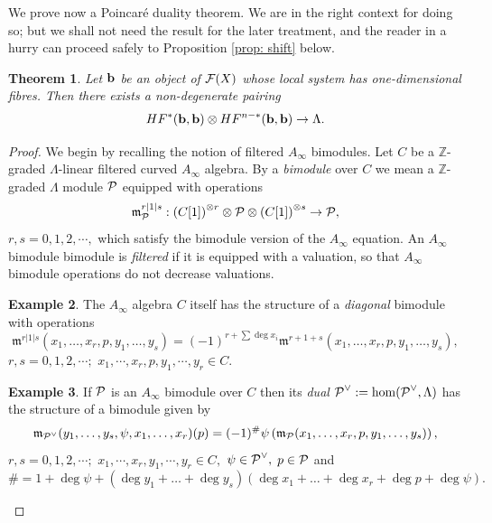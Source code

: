 \documentclass{article}
\theoremstyle{plain}%
\newtheorem{thm}{Theorem}[section]
\theoremstyle{definition}
\newtheorem{exam}[thm]{Example}
\numberwithin{equation}{section}
\numberwithin{figure}{section}
\def\l{\label}
\def\fm{{\mathfrak m}}
\def\cF{{\mathbin{\cal F}}}
\def\cP{{\mathbin{\cal P}}}
\def\Z{{\mathbin{\mathbb Z}}}
\def\ps{\psi}
\def\La{\Lambda}
\def\iy{\infty}
\begin{document}
We prove now a Poincar\'e duality theorem. We are in the right context for doing so; but we shall not need the result for the later treatment, and the reader in a hurry can proceed safely to Proposition \ref{prop: shift} below.
\begin{thm}\l{thm: PD}
Let ${\mathbf{b}}$ be an object of $\cF(X)$ whose local system has one-dimensional fibres. 
Then there exists a non-degenerate pairing
  \begin{equation}
    HF^*(\b,\b) \otimes HF^{n-*}(\b,\b) \to \La.
  \end{equation}
\end{thm}
\begin{proof}
We begin by recalling the notion of filtered $A_\iy$ bimodules.
Let $C$ be a $\Z$-graded $\La$-linear filtered curved $A_\iy$ algebra.
By a {\it bimodule} over $C$ we mean
a $\Z$-graded $\La$ module $\cP$ equipped with operations
\begin{equation}
  \label{eq:bimodule_structure_maps}
  \fm_{\cP}^{r|1|s} :  \left(C[1]\right)^{\otimes r} \otimes \cP \otimes \left(C[1]\right)^{\otimes s} \to  \cP,
\end{equation}
$r,s=0,1,2,\cdots,$ which satisfy the bimodule version of the $A_\infty$ equation. An $A_\infty$ bimodule bimodule is {\it filtered} if it is equipped with a valuation, so that $A_\infty$ bimodule operations do not decrease valuations.
\begin{exam}
The $A_\iy$ algebra $C$ itself has the structure of a {\it diagonal} bimodule with operations
  \begin{equation} \label{eq:product_diagonal_bimodule}
  \fm^{r|1|s} (x_1, \ldots, x_r, p, y_1, \ldots, y_s  ) = (-1)^{r + \sum \deg x_i} \fm^{r+1+s} ( x_1, \ldots, x_r, p, y_1, \ldots, y_s   ),
\end{equation}
$r,s=0,1,2,\cdots;$ $x_1,\cdots,x_r,p,y_1,\cdots,y_r\in C.$
\end{exam}
\begin{exam}
If $\cP$ is an $A_\iy$ bimodule over $C$ then its {\it dual} 
$  \cP^{\vee}:= \hom(\cP^{\vee}, \La)$ has the structure of a bimodule given by
\begin{equation} \label{eq:structure_maps_dual_bimodule}
  \fm_{\cP^{\vee}}(y_1, \ldots, y_s ,  \psi, x_1, \ldots, x_r)(p) = (-1)^\#  \psi\left( \fm_{\cP}(x_1, \ldots, x_r, p,  y_1, \ldots, y_s )\right),
\end{equation}
$r,s=0,1,2,\cdots;$ $x_1,\cdots,x_r,y_1,\cdots,y_r\in C,$ $\ps\in\cP^\vee,$ $p\in \cP$ and
$\#=1+\deg\ps+(\deg y_1+\dots+\deg y_s)(\deg x_1+\dots+\deg x_r+\deg p+\deg \ps).$
\end{exam}


\end{proof}
\end{document}
